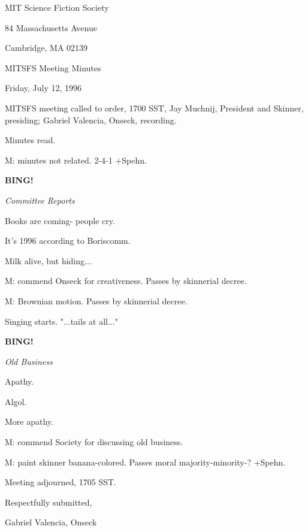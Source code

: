 \documentclass[12pt]{article}
\newcommand{\bing}{{\bf BING!} }
\newcommand{\goto}[1]{\bing \vskip 12pt \centerline{{\em{#1}}}}
\begin{document}
\begin{center}

MIT Science Fiction Society 

84 Massachusetts Avenue

Cambridge, MA 02139

\vspace{12pt}

MITSFS Meeting Minutes 

Friday, July 12, 1996

\end{center}
 
\vspace{18pt}

\setlength{\parskip}{6pt}

\noindent
MITSFS meeting called to order, 1700 SST,
Jay Muchnij, President and Skinner, presiding; Gabriel Valencia, Onseck, recording.

Minutes read.

M: minutes not related. 2-4-1 +Spehn.

\goto{Committee Reports}

Books are coming- people cry.

It's 1996 according to Boriscomm.

Milk alive, but hiding...

M: commend Onseck for creativeness. Passes by skinnerial decree.

M: Brownian motion. Passes by skinnerial decree.

Singing starts. "...tails at all..."

\goto{Old Business}

Apathy.

Algol.

More apathy.

M: commend Society for discussing old business.

M: paint skinner banana-colored. Passes moral majority-minority-? +Spehn.

\vspace{12pt}

\noindent
Meeting adjourned, 1705 SST.

\vspace{18pt}

\centerline{Respectfully submitted,}
\centerline{Gabriel Valencia, Onseck}
\end{document}
